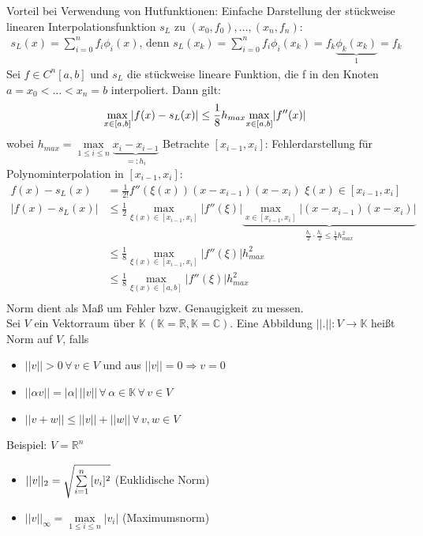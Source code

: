 Vorteil bei Verwendung von Hutfunktionen: Einfache Darstellung der stückweise
linearen Interpolationsfunktion $s_L$ zu $(x_0,f_0),\ldots,(x_n,f_n)$:
\begin{align*}
  s_L(x)=\sum_{i=0}^n f_i \phi_i(x) \text{, denn } s_L(x_k)=\sum_{i=0}^n f_i \phi_i(x_k) = f_k \underbrace{\phi_k(x_k)}_{1} = f_k
\end{align*}
 Sei $f \in C^n[a,b]$ und $s_L$ die stückweise lineare Funktion, die f in den Knoten
$a=x_0<\ldots<x_n=b$ interpoliert. Dann gilt:
\begin{align*}
  \underset{x \in [a, b]}{\max} |f(x)-s_L(x)| \leq \frac{1}{8}h_{max} \underset{x \in [a, b]}{\max} |f''(x)|
\end{align*}
wobei $h_{max} = \underset{1 \leq i \leq n}{\max} \underbrace{x_i - x_{i-1}}_{=:h_i}$
 Betrachte $[x_{i-1},x_i]$:
Fehlerdarstellung für Polynominterpolation in $[x_{i-1},x_i]$:
\begin{align*}
  f(x)-s_L(x) &= \frac{1}{2!} f''(\xi(x))(x-x_{i-1})(x-x_i) \,\, \xi(x) \in [x_{i-1},x_i]\\
  |f(x)-s_L(x)| &\leq \frac{1}{2} \underset{\xi(x) \in [x_{i-1},x_i]}{\max}|f''(\xi)| 
  \underbrace{\underset{x \in [x_{i-1},x_i]}{\max}|(x-x_{i-1})(x-x_i)|}_{\frac{h_i}{2}\cdot\frac{h_i}{2}\leq\frac{1}{4}h_{max}^2}\\
  &\leq \frac{1}{8} \underset{\xi(x) \in [x_{i-1},x_i]}{\max}|f''(\xi)| h_{max}^2\\
  &\leq \frac{1}{8} \underset{\xi(x) \in [a,b]}{\max}|f''(\xi)| h_{max}^2\\
\end{align*}
Norm dient als Maß um Fehler bzw. Genaugigkeit zu messen.\\
 Sei $V$ ein Vektorraum über $\mathbb{K}\,(\mathbb{K}=\mathbb{R}, \mathbb{K}=\mathbb{C})$.
Eine Abbildung $||.||: V\rightarrow\mathbb{K}$ heißt Norm auf $V$, falls
\begin{itemize}
  \item $||v||>0\, \forall\, v \in V$ und aus $||v||=0 \Rightarrow v = 0$
  \item $||\alpha v|| = |\alpha|\,||v||\, \forall\, \alpha \in \mathbb{K}\, \forall\, v \in V$
  \item $||v+w|| \leq ||v|| + ||w||\, \forall\,v,w\in V$
\end{itemize}
Beispiel: $V=\mathbb{R}^n$\\
\begin{itemize}
  \item $||v||_2 = \sqrt{\sum\limits_{i=1}^{n}{[v_i]^2}}$ (Euklidische Norm)
  \item $||v||_{\infty} = \underset{1 \leq i \leq n}{\max} |v_i|$ (Maximumsnorm)
\end{itemize}
